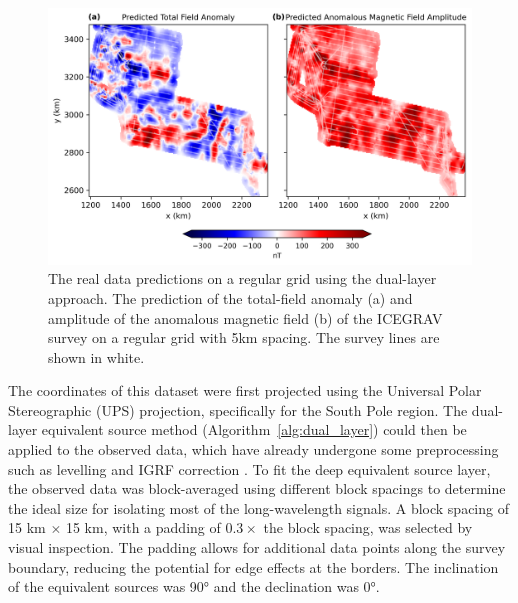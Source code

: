 \begin{figure}[tb!]
\centering
\includegraphics[width=1\linewidth]{figures/real_grid_pred.png}
\caption{
    The real data predictions on a regular grid using the dual-layer approach. The prediction of the total-field anomaly (a) and amplitude of the anomalous magnetic field (b) of the ICEGRAV survey \citep{ICEGRAV_data} on a regular grid with 5km spacing. The survey lines are shown in white.
}
\label{fig:real_grid_pred}
\end{figure}

The coordinates of this dataset were first projected using the Universal Polar Stereographic (UPS) projection, specifically for the South Pole region. The dual-layer equivalent source method (Algorithm~\ref{alg:dual_layer}) could then be applied to the observed data, which have already undergone some preprocessing such as levelling and IGRF correction \citep{ICEGRAV_data}. To fit the deep equivalent source layer, the observed data was block-averaged using different block spacings to determine the ideal size for isolating most of the long-wavelength signals. A block spacing of 15 km $\times$ 15 km, with a padding of $ 0.3 \times $ the block spacing, was selected by visual inspection. The padding allows for additional data points along the survey boundary, reducing the potential for edge effects at the borders. 
The inclination of the equivalent sources was \ang{90} and the declination was \ang{0}.

